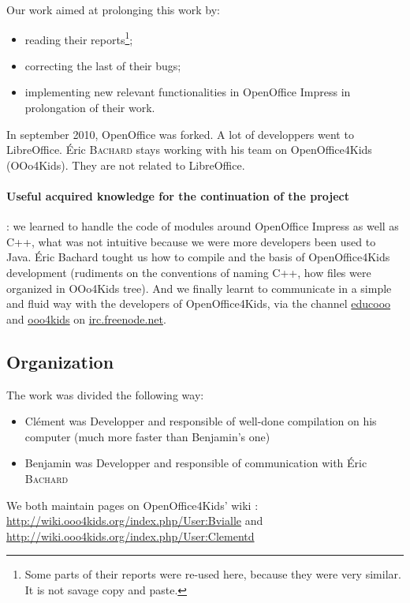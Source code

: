 \documentclass[a4paper,11pt]{article}
\begin{document}
Our work aimed at prolonging this work by:

\begin{itemize}
\item reading their reports\footnote{Some parts of their reports were re-used here, because they were very similar. It is not savage copy and paste.};
\item correcting the last of their bugs;
\item implementing new relevant functionalities in OpenOffice Impress in prolongation of their work.
\end{itemize}

In september 2010, OpenOffice was forked. A lot of developpers went to LibreOffice. Éric \textsc{Bachard} stays working with his team on OpenOffice4Kids (OOo4Kids). They are not related to LibreOffice.

\paragraph{Useful acquired knowledge for the continuation of the project} : we learned to handle the code of modules around OpenOffice Impress as well as C++, what was not intuitive because we were more developers been used to Java. Éric Bachard tought us how to compile and the basis of OpenOffice4Kids development (rudiments on the conventions of naming C++, how files were organized in OOo4Kids tree). And we finally learnt to communicate in a simple and fluid way with the developers of OpenOffice4Kids, via the channel \url{educooo} and \url{ooo4kids} on \url{irc.freenode.net}.

\subsection*{Organization}

The work was divided the following way:
\begin{itemize}
\item Clément was Developper and responsible of well-done compilation on his computer (much more faster than Benjamin's one)
\item Benjamin was Developper and responsible of communication with Éric \textsc{Bachard}
\end{itemize}

We both maintain pages on OpenOffice4Kids' wiki : \url{http://wiki.ooo4kids.org/index.php/User:Bvialle} and \url{http://wiki.ooo4kids.org/index.php/User:Clementd}
\end{document}
